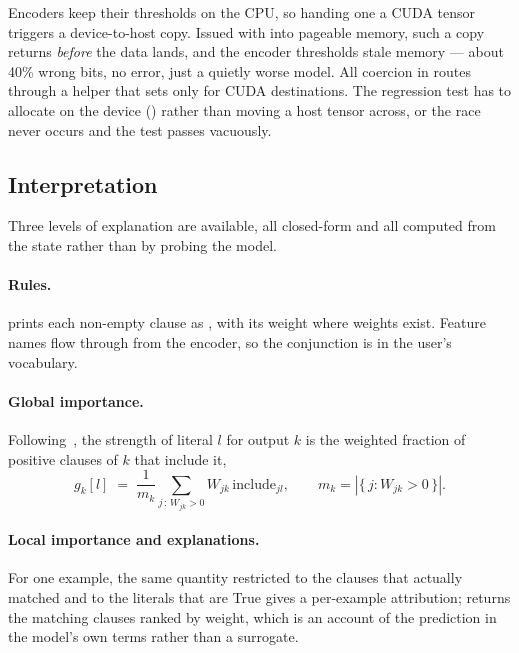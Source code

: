 \begin{ttcallout}
Encoders keep their thresholds on the CPU, so handing one a CUDA tensor triggers a
device-to-host copy. Issued with  into pageable memory, such a copy
returns \emph{before} the data lands, and the encoder thresholds stale memory --- about 40\%
wrong bits, no error, just a quietly worse model. All coercion in \ttlibname routes through a
helper that sets  only for CUDA destinations. The regression test has to
allocate on the device () rather than moving a host tensor
across, or the race never occurs and the test passes vacuously.
\end{ttcallout}

\subsection{Interpretation}

Three levels of explanation are available, all closed-form and all computed from the state
rather than by probing the model.

\paragraph{Rules.}  prints each non-empty clause as
, with its weight where weights exist. Feature names flow
through from the encoder, so the conjunction is in the user's vocabulary.

\paragraph{Global importance.} Following~, the strength of literal $l$ for output
$k$ is the weighted fraction of positive clauses of $k$ that include it,
\[
  g_k[l] \;=\; \frac{1}{m_k}\sum_{j \,:\, W_{jk} > 0} W_{jk}\,\mathrm{include}_{jl},
  \qquad m_k = \left|\{\,j : W_{jk} > 0\,\}\right| .
\]

\paragraph{Local importance and explanations.} For one example, the same quantity restricted
to the clauses that actually matched and to the literals that are True gives a per-example
attribution;  returns the matching clauses ranked by weight, which is
an account of the prediction in the model's own terms rather than a surrogate.

